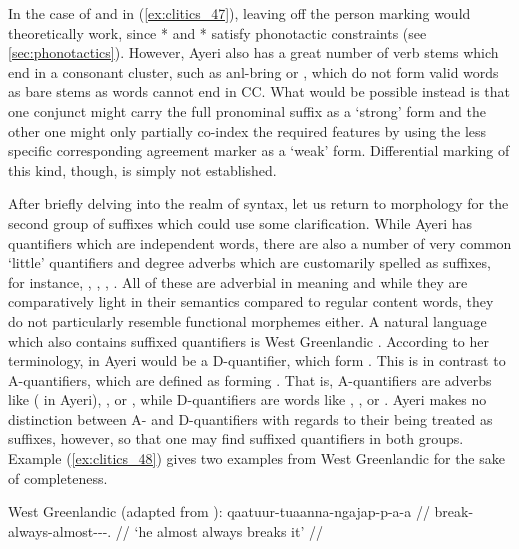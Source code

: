 In the case of  and  in
(\ref{ex:clitics_47}), leaving off the person marking would theoretically work,
since * and * satisfy phonotactic
constraints (see \autoref{sec:phonotactics}). However, Ayeri also has a great
number of verb stems which end in a consonant cluster, such as 
{anl-}{bring} or , which do not form valid words as bare
stems as words cannot end in CC. What would be possible instead is that one
conjunct might carry the full pronominal suffix as a `strong' form and the
other one might only partially co-index the required features by using the less
specific corresponding agreement marker as a `weak' form. Differential marking
of this kind, though, is simply not established.

After briefly delving into the realm of syntax, let us return to morphology for
the second group of suffixes which could use some clarification. While Ayeri
has quantifiers which are independent words, there are also a number of very
common `little' quantifiers and degree adverbs which are customarily spelled as
suffixes, for instance, ,
, ,
. All of these are adverbial in meaning and while they
are comparatively light in their semantics compared to regular content words,
they do not particularly resemble functional morphemes either. A natural
language which also contains suffixed quantifiers is West Greenlandic
\citep{bittner1995}. According to her terminology,  in Ayeri
would be a D-quantifier, which form . This is in contrast to A-quantifiers, which are
defined as forming . That is, A-quantifiers are adverbs like 
( in Ayeri), , or , while D-quantifiers
are words like , , or . Ayeri makes no distinction
between A- and D-quantifiers with regards to their being treated as suffixes,
however, so that one may find suffixed quantifiers in both groups. Example
(\ref{ex:clitics_48}) gives two examples from West Greenlandic for the sake of
completeness.

\pex\label{ex:clitics_48}
West Greenlandic (adapted from \cite{bittner1995}):
\a\label{ex:clitics_48a}\begingl
	\gla qaatuur-tuaanna-ngajap-p-a-a //
	\glb break-always-almost-\Ind{}-\Tr{}-\Tsg{}.\Tsg{} //
	\glft `he almost always breaks it'  //
\endgl

